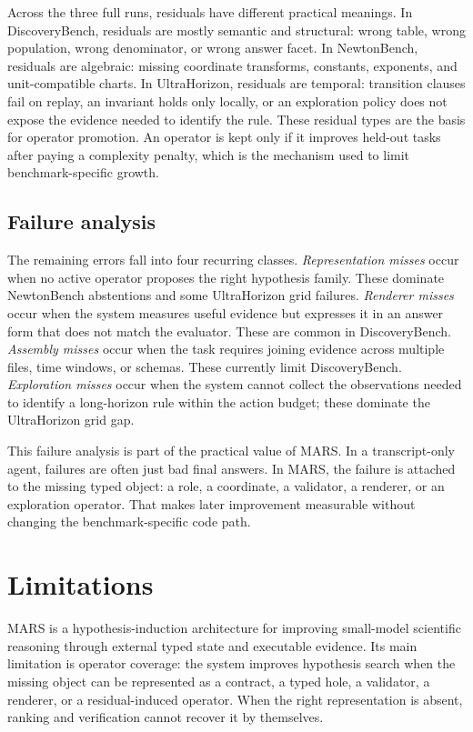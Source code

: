 \documentclass[letterpaper]{article}
\newcommand{\mars}{\textsc{MARS}\xspace}
\begin{document}
Across the three full runs, residuals have different practical meanings. In
DiscoveryBench, residuals are mostly semantic and structural: wrong table,
wrong population, wrong denominator, or wrong answer facet. In NewtonBench,
residuals are algebraic: missing coordinate transforms, constants, exponents,
and unit-compatible charts. In UltraHorizon, residuals are temporal:
transition clauses fail on replay, an invariant holds only locally, or an
exploration policy does not expose the evidence needed to identify the rule.
These residual types are the basis for operator promotion. An operator is kept
only if it improves held-out tasks after paying a complexity penalty, which is
the mechanism used to limit benchmark-specific growth.

\subsection{Failure analysis}

The remaining errors fall into four recurring classes. \emph{Representation
misses} occur when no active operator proposes the right hypothesis family.
These dominate NewtonBench abstentions and some UltraHorizon grid failures.
\emph{Renderer misses} occur when the system measures useful evidence but
expresses it in an answer form that does not match the evaluator. These are
common in DiscoveryBench. \emph{Assembly misses} occur when the task requires
joining evidence across multiple files, time windows, or schemas. These
currently limit DiscoveryBench.
\emph{Exploration misses} occur when the system cannot collect the observations
needed to identify a long-horizon rule within the action budget; these dominate
the UltraHorizon grid gap.

This failure analysis is part of the practical value of \mars. In a
transcript-only agent, failures are often just bad final answers. In \mars, the
failure is attached to the missing typed object: a role, a coordinate, a
validator, a renderer, or an exploration operator. That makes later improvement
measurable without changing the benchmark-specific code path.

\FloatBarrier

\section{Limitations}

\mars is a hypothesis-induction architecture for improving small-model
scientific reasoning through external typed state and executable evidence. Its
main limitation is operator coverage: the system improves hypothesis search
when the missing object can be represented as a contract, a typed hole, a
validator, a renderer, or a residual-induced operator. When the right
representation is absent, ranking and verification cannot recover it by
themselves.
\end{document}
